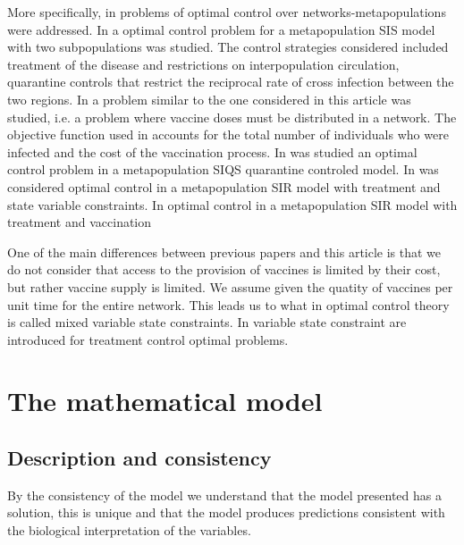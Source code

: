 \documentclass[a4paper,10pt]{article}
\theoremstyle{remark}
\begin{document}
More specifically, in \cite{rowthorn2009optimal,asano2008optimal, mbah2011resource,Chen-2014,Chen-2014b}  problems of optimal control over networks-metapopulations were addressed.
In \cite{rowthorn2009optimal} a optimal control problem for a metapopulation SIS model with two subpopulations was studied.  The control strategies considered included treatment of the disease and restrictions on interpopulation circulation, quarantine controls that
restrict the reciprocal rate of cross infection between
the two regions. In \cite{asano2008optimal} a problem similar to the one considered in this article was studied, i.e. a problem  where vaccine doses must be distributed in a network. The objective function used in \cite{asano2008optimal} accounts for the total number of individuals who were infected and the cost of the vaccination process.  In \cite{Li-2019} was studied an optimal control problem in a metapopulation  SIQS quarantine controled  model. In \cite{mbah2011resource} was considered optimal control in a metapopulation  SIR model with   treatment and state variable constraints. 
In \cite{Chen-2014,Chen-2014b} optimal control in a metapopulation  SIR model with   treatment and vaccination
 
 One of the main differences between previous papers  and this article is that we do not consider that access to the provision of vaccines is  limited by their cost, but rather vaccine supply is limited. We assume given the quatity of vaccines per unit time   for the entire network. This leads us to what in optimal control theory is called mixed variable state constraints. In \cite{mbah2011resource, rowthorn2009optimal} variable state constraint are introduced for  treatment control optimal problems.  

 

 
\section{The mathematical model}

\subsection{Description and consistency}
By the consistency of the model we understand that the model presented has a solution, this is unique and that the model produces predictions consistent with the biological interpretation of the variables.
\end{document}
